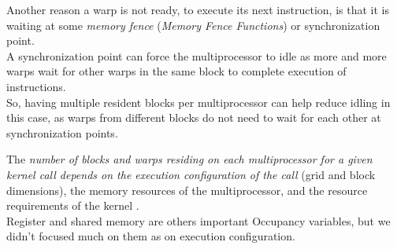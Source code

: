 	Another reason a warp is not ready, to execute its next instruction, is that it is waiting at some \textit{memory fence} (\textit{Memory Fence Functions}) or synchronization point.\\ A synchronization point can force the multiprocessor to idle as	more and more warps wait for other warps in the same block to complete execution of instructions.\\
	So, having multiple resident blocks per multiprocessor can help reduce idling in this case, as warps from different blocks do not need to wait for each other at synchronization points.
	
	The \textit{number of blocks and warps residing on each multiprocessor for a given kernel call depends on the execution configuration of the call} (grid and block dimensions), the memory resources of the multiprocessor, and the resource requirements of the kernel \cite{cudaguide}.\\
	Register and shared memory are others important Occupancy variables, but we didn't focused much on them as on execution configuration.\\

